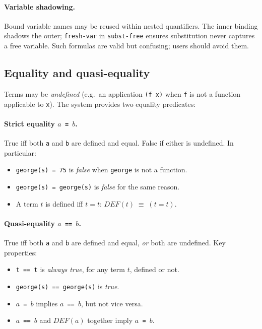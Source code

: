 \documentclass{amsbook}[openany]
\theoremstyle{definition}
\theoremstyle{remark}
\theoremstyle{remark}
\begin{document}
\paragraph{Variable shadowing.}
Bound variable names may be reused within nested quantifiers.
The inner binding shadows the outer; \texttt{fresh-var} in
\texttt{subst-free} ensures substitution never captures a free variable.
Such formulas are valid but confusing; users should avoid them.

\subsection{Equality and quasi-equality}

Terms may be \emph{undefined} (e.g.\ an application \texttt{(f x)} when
\texttt{f} is not a function applicable to \texttt{x}).  The system
provides two equality predicates:

\paragraph{Strict equality \texttt{$a$ = $b$}.}
True iff both \texttt{a} and \texttt{b} are defined and equal.
False if either is undefined.  In particular:
\begin{itemize}[label=$-$, leftmargin=1cm]
\item \texttt{george(s) = 75} is \emph{false} when \texttt{george}
  is not a function.
\item \texttt{george(s) = george(s)} is \emph{false} for the same
  reason.
\item A term $t$ is defined iff $t = t$:
  $\mathit{DEF}(t) \;\equiv\; (t = t)$.
\end{itemize}

\paragraph{Quasi-equality \texttt{$a$ == $b$}.}
True iff both \texttt{a} and \texttt{b} are defined and equal, \emph{or}
both are undefined.  Key properties:
\begin{itemize}[label=$-$, leftmargin=1cm]
\item \texttt{t == t} is \emph{always true}, for any term $t$,
  defined or not.
\item \texttt{george(s) == george(s)} is \emph{true}.
\item \texttt{$a$ = $b$} implies \texttt{$a$ == $b$}, but not vice versa.
\item \texttt{$a$ == $b$} and $\mathit{DEF}(a)$ together imply
  \texttt{$a$ = $b$}.
\end{itemize}
\end{document}
